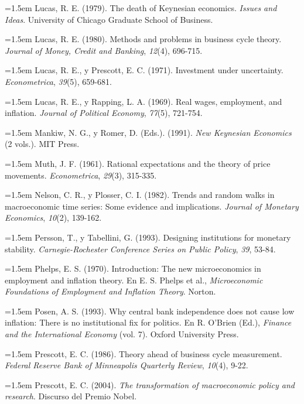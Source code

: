\documentclass[10pt,a4paper]{article}
\begin{document}
\noindent\hangindent=1.5em Lucas, R. E. (1979). The death of Keynesian economics. \textit{Issues and Ideas}. University of Chicago Graduate School of Business.

\noindent\hangindent=1.5em Lucas, R. E. (1980). Methods and problems in business cycle theory. \textit{Journal of Money, Credit and Banking}, \textit{12}(4), 696-715.

\noindent\hangindent=1.5em Lucas, R. E., y Prescott, E. C. (1971). Investment under uncertainty. \textit{Econometrica}, \textit{39}(5), 659-681.

\noindent\hangindent=1.5em Lucas, R. E., y Rapping, L. A. (1969). Real wages, employment, and inflation. \textit{Journal of Political Economy}, \textit{77}(5), 721-754.

\noindent\hangindent=1.5em Mankiw, N. G., y Romer, D. (Eds.). (1991). \textit{New Keynesian Economics} (2 vols.). MIT Press.

\noindent\hangindent=1.5em Muth, J. F. (1961). Rational expectations and the theory of price movements. \textit{Econometrica}, \textit{29}(3), 315-335.

\noindent\hangindent=1.5em Nelson, C. R., y Plosser, C. I. (1982). Trends and random walks in macroeconomic time series: Some evidence and implications. \textit{Journal of Monetary Economics}, \textit{10}(2), 139-162.

\noindent\hangindent=1.5em Persson, T., y Tabellini, G. (1993). Designing institutions for monetary stability. \textit{Carnegie-Rochester Conference Series on Public Policy}, \textit{39}, 53-84.

\noindent\hangindent=1.5em Phelps, E. S. (1970). Introduction: The new microeconomics in employment and inflation theory. En E. S. Phelps et al., \textit{Microeconomic Foundations of Employment and Inflation Theory}. Norton.

\noindent\hangindent=1.5em Posen, A. S. (1993). Why central bank independence does not cause low inflation: There is no institutional fix for politics. En R. O'Brien (Ed.), \textit{Finance and the International Economy} (vol. 7). Oxford University Press.

\noindent\hangindent=1.5em Prescott, E. C. (1986). Theory ahead of business cycle measurement. \textit{Federal Reserve Bank of Minneapolis Quarterly Review}, \textit{10}(4), 9-22.

\noindent\hangindent=1.5em Prescott, E. C. (2004). \textit{The transformation of macroeconomic policy and research}. Discurso del Premio Nobel.
\end{document}
